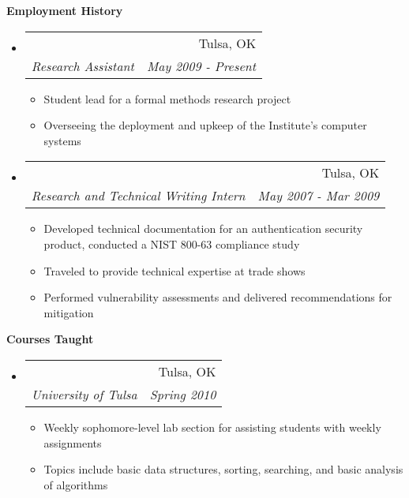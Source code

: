 \documentclass[letterpaper,11pt]{article}
\makeatletter
\newcommand{\resitem}[1]{\item #1 \vspace{-2pt}}
\newcommand{\resheading}[1]{{\large \colorbox{mygrey}{\begin{minipage}{\textwidth}{\textbf{#1 \vphantom{p\^{E}}}}\end{minipage}}}}
\newcommand{\ressubheading}[4]{
\begin{tabular*}{6.5in}{l@{\extracolsep{\fill}}r}
		\textbf{\parbox{5in}{\raggedright #1 }} & #2 \\
		\textit{#3} & \textit{#4} \\
\end{tabular*}\vspace{-6pt}}
\makeatother
\begin{document}

\resheading{Employment History}
\begin{itemize}
\item
	\ressubheading{Institute for Information Security, TU}{Tulsa, OK}{Research Assistant}{May 2009 - Present}
	\begin{itemize}
		\resitem{Student lead for a formal methods research project}
		\resitem{Overseeing the deployment and upkeep of the Institute's computer systems}
	\end{itemize}

\item
	\ressubheading{Vidoop}{Tulsa, OK}{Research and Technical Writing Intern}{May 2007 - Mar 2009}
	\begin{itemize}
		\resitem{Developed technical documentation for an authentication security product, conducted a NIST 800-63 compliance study}
		\resitem{Traveled to provide technical expertise at trade shows}
		\resitem{Performed vulnerability assessments and delivered recommendations for mitigation}
	\end{itemize}
\end{itemize}

\resheading{Courses Taught}
\begin{itemize}
\item
	\ressubheading{Fundamentals of Algorithm and Computer Applications Lab}{Tulsa, OK}{University of Tulsa}{Spring 2010}
	\begin{itemize}
		\resitem{Weekly sophomore-level lab section for assisting students with weekly assignments}
		\resitem{Topics include basic data structures, sorting, searching, and basic analysis of algorithms}
	\end{itemize}
\end{itemize}
\end{document}

